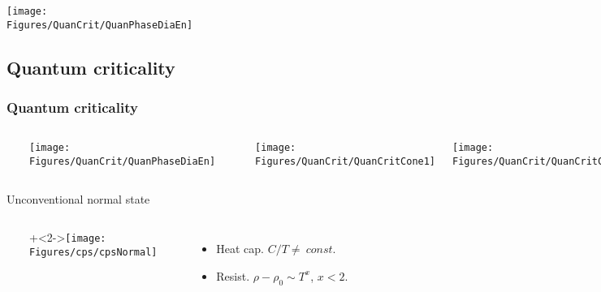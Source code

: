 {\begin{frame}[label=Quancrit]
\centerline{\texttt{[image: \\Figures/QuanCrit/QuanPhaseDiaEn]}}



\end{frame}


\subsection{Quantum criticality}
\begin{frame}[label=quancrit3]
\frametitle{Quantum criticality}
\begin{columns}[t]
\centerline{~}
\texttt{[image: \\Figures/QuanCrit/QuanPhaseDiaEn]}

\centerline{~}
\centerline{\texttt{[image: \\Figures/QuanCrit/QuanCritCone1]}}

\centerline{\texttt{[image: \\Figures/QuanCrit/QuanCritCone2]}}

\end{columns}

\end{frame}


\begin{frame}[label=CCSNormal1]{Unconventional normal state}
  \vspace{-1ex}
  \begin{columns}[t]
    \centerline{~}
    \onslide+<2->{\texttt{[image: \\Figures/cps/cpsNormal]}}

    \centerline{~}
    \vspace{-2ex}
    \begin{itemize}
    \item
      Heat cap. $C/T \neq ~{const.}$
    \item
      Resist. $\rho-\rho_0 \sim T^x$, $x<2$.
    \end{itemize}


\end{columns}
\end{frame}}
